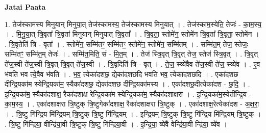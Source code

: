 \documentclass[17pt]{extarticle}
\begin{document}
\textbf{Jatai Paata} \newline

1. तेज॑स्कामस्य मिनुयान् मिनुया॒त् तेज॑स्कामस्य॒ तेज॑स्कामस्य मिनुयात् । . तेज॑स्काम॒स्येति॒ तेजः॑ - का॒म॒स्य॒ । . मि॒नु॒या॒त् त्रि॒वृता᳚ त्रि॒वृता॑ मिनुयान् मिनुयात् त्रि॒वृता᳚ । . त्रि॒वृता॒ स्तोमे॑न॒ स्तोमे॑न त्रि॒वृता᳚ त्रि॒वृता॒ स्तोमे॑न । . त्रि॒वृतेति॑ त्रि - वृता᳚ । . स्तोमे॑न॒ सम्मि॑तꣳ॒॒ सम्मि॑तꣳ॒॒ स्तोमे॑न॒ स्तोमे॑न॒ सम्मि॑तम् । . सम्मि॑त॒म् तेज॒ स्तेजः॒ सम्मि॑तꣳ॒॒ सम्मि॑त॒म् तेजः॑ । . सम्मि॑त॒मिति॒ सं - मि॒त॒म् । . तेज॑ स्त्रि॒वृत् त्रि॒वृत् तेज॒ स्तेज॑ स्त्रि॒वृत् । . त्रि॒वृत् ते॑ज॒स्वी ते॑ज॒स्वी त्रि॒वृत् त्रि॒वृत् ते॑ज॒स्वी । . त्रि॒वृदिति॑ त्रि - वृत् । . ते॒ज॒ स्व्ये॑वैव ते॑ज॒स्वी ते॑ज॒ स्व्ये॑व । . ए॒व भ॑वति भव त्ये॒वैव भ॑वति । . भ॒व॒ त्येका॑दशछ॒ द्येका॑दशछदि भवति भव॒ त्येका॑दशछदि । . एका॑दशछ दीन्द्रि॒यका॑म स्येन्द्रि॒यका॑म॒ स्यैका॑दशछ॒ द्येका॑दशछ दीन्द्रि॒यका॑मस्य । . एका॑दशछ॒दीत्येका॑दश - छ॒दि॒ । . इ॒न्द्रि॒यका॑म॒ स्यैका॑दशाक्ष॒ रैका॑दशाक्ष रेन्द्रि॒यका॑म स्येन्द्रि॒यका॑म॒ स्यैका॑दशाक्षरा । . इ॒न्द्रि॒यका॑म॒स्येती᳚न्द्रि॒य - का॒म॒स्य॒ । . एका॑दशाक्षरा त्रि॒ष्टुक् त्रि॒ष्टुगेका॑दशाक्ष॒ रैका॑दशाक्षरा त्रि॒ष्टुक् । . एका॑दशाक्ष॒रेत्येका॑दश - अ॒क्ष॒रा॒ । . त्रि॒ष्टु गि॑न्द्रि॒य मि॑न्द्रि॒यम् त्रि॒ष्टुक् त्रि॒ष्टु गि॑न्द्रि॒यम् । . इ॒न्द्रि॒यम् त्रि॒ष्टुक् त्रि॒ष्टु गि॑न्द्रि॒य मि॑न्द्रि॒यम् त्रि॒ष्टुक् । . त्रि॒ष्टु गि॑न्द्रिया॒ वीन्द्रि॑या॒वी त्रि॒ष्टुक् त्रि॒ष्टु गि॑न्द्रिया॒वी । . इ॒न्द्रि॒या॒ व्ये॑वै वेन्द्रि॑या॒वी न्द्रि॑या॒ व्ये॑व । \newline
\end{document}
